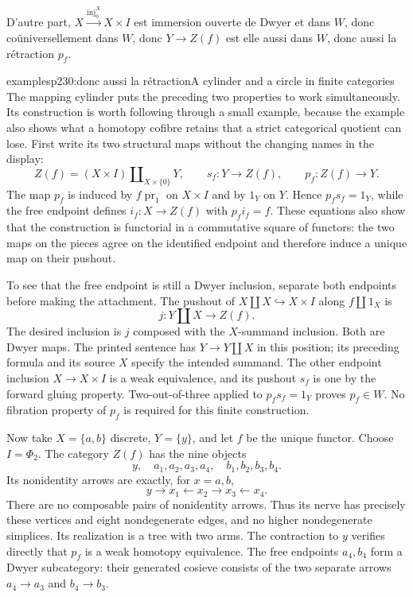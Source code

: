D'autre part, $X \xrightarrow{\mathrm{inj}_0^X} X \times I$ est immersion ouverte de Dwyer et dans $W$, donc coüniversellement dans $W$, donc $Y \longrightarrow Z(f)$ est elle aussi dans $W$, donc aussi la rétraction $p_f$.

\begin{dcomment}{examples}{p230:donc aussi la rétraction}{A cylinder and a circle in finite categories}
The mapping cylinder puts the preceding two properties to work simultaneously. Its construction is worth following through a small example, because the example also shows what a homotopy cofibre retains that a strict categorical quotient can lose. First write its two structural maps without the changing names in the display:
\[
 Z(f)=(X\times I)\amalg_{X\times\{0\}}Y,
 \qquad s_f:Y\longrightarrow Z(f),
 \qquad p_f:Z(f)\longrightarrow Y.
\]
The map $p_f$ is induced by $f\operatorname{pr}_1$ on $X\times I$ and by $1_Y$ on $Y$. Hence $p_fs_f=1_Y$, while the free endpoint defines $i_f:X\to Z(f)$ with $p_fi_f=f$. These equations also show that the construction is functorial in a commutative square of functors: the two maps on the pieces agree on the identified endpoint and therefore induce a unique map on their pushout.

To see that the free endpoint is still a Dwyer inclusion, separate both endpoints before making the attachment. The pushout of $X\amalg X\hookrightarrow X\times I$ along $f\amalg1_X$ is
\[
 j:Y\amalg X\longrightarrow Z(f).
\]
The desired inclusion is $j$ composed with the $X$-summand inclusion. Both are Dwyer maps. The printed sentence has $Y\to Y\amalg X$ in this position; its preceding formula and its source $X$ specify the intended summand. The other endpoint inclusion $X\to X\times I$ is a weak equivalence, and its pushout $s_f$ is one by the forward gluing property. Two-out-of-three applied to $p_fs_f=1_Y$ proves $p_f\in W$. No fibration property of $p_f$ is required for this finite construction.

Now take $X=\{a,b\}$ discrete, $Y=\{y\}$, and let $f$ be the unique functor. Choose $I=\Phi_2$. The category $Z(f)$ has the nine objects
\[
 y,\quad a_1,a_2,a_3,a_4,\quad b_1,b_2,b_3,b_4.
\]
Its nonidentity arrows are exactly, for $x=a,b$,
\[
 y\longrightarrow x_1\longleftarrow x_2
       \longrightarrow x_3\longleftarrow x_4.
\]
There are no composable pairs of nonidentity arrows. Thus its nerve has precisely these vertices and eight nondegenerate edges, and no higher nondegenerate simplices. Its realization is a tree with two arms. The contraction to $y$ verifies directly that $p_f$ is a weak homotopy equivalence. The free endpoints $a_4,b_4$ form a Dwyer subcategory: their generated cosieve consists of the two separate arrows $a_4\to a_3$ and $b_4\to b_3$.


\end{dcomment}
